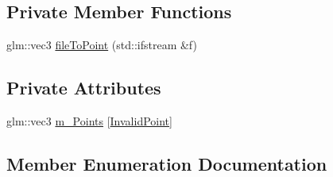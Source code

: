\subsection*{Private Member Functions}
\begin{DoxyCompactItemize}
\item 
glm\+::vec3 \hyperlink{class_face3_d_1_1_face_coordinates3d_adbc5a5615a2a469b98d995157445e4f7}{file\+To\+Point} (std\+::ifstream \&f)
\end{DoxyCompactItemize}
\subsection*{Private Attributes}
\begin{DoxyCompactItemize}
\item 
glm\+::vec3 \hyperlink{class_face3_d_1_1_face_coordinates3d_aa4646a4766c4c5a8ce010ec05f49ffab}{m\+\_\+\+Points} \mbox{[}\hyperlink{class_face3_d_1_1_face_coordinates3d_a8bedd28eb0ab2749aa98a888921ea2b2a7a89277f3a276a2c9c008860d4e73e99}{Invalid\+Point}\mbox{]}
\end{DoxyCompactItemize}


\subsection{Member Enumeration Documentation}
